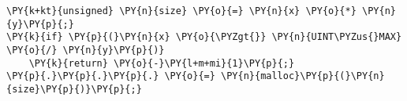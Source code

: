 \begin{Verbatim}[commandchars=\\\{\},codes={\catcode`\$=3\catcode`\^=7\catcode`\_=8}]
\PY{k+kt}{unsigned} \PY{n}{size} \PY{o}{=} \PY{n}{x} \PY{o}{*} \PY{n}{y}\PY{p}{;}
\PY{k}{if} \PY{p}{(}\PY{n}{x} \PY{o}{\PYZgt{}} \PY{n}{UINT\PYZus{}MAX} \PY{o}{/} \PY{n}{y}\PY{p}{)}
    \PY{k}{return} \PY{o}{-}\PY{l+m+mi}{1}\PY{p}{;}
\PY{p}{.}\PY{p}{.}\PY{p}{.} \PY{o}{=} \PY{n}{malloc}\PY{p}{(}\PY{n}{size}\PY{p}{)}\PY{p}{;}
\end{Verbatim}
